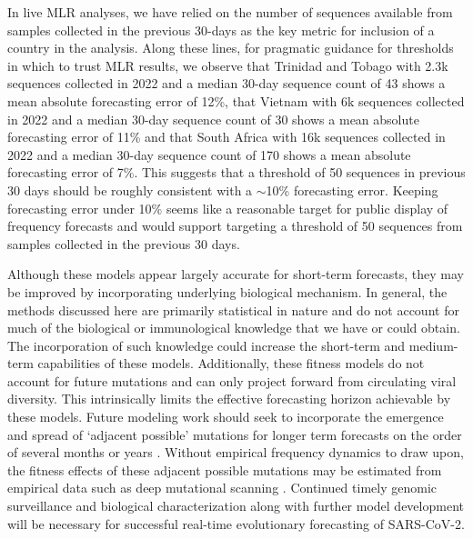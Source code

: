 \documentclass[10pt,letterpaper]{article}
\begin{document}
In live MLR analyses, we have relied on the number of sequences available from samples collected in the previous 30-days as the key metric for inclusion of a country in the analysis.
Along these lines, for pragmatic guidance for thresholds in which to trust MLR results, we observe that Trinidad and Tobago with 2.3k sequences collected in 2022 and a median 30-day sequence count of 43 shows a mean absolute forecasting error of 12\%, that Vietnam with 6k sequences collected in 2022 and a median 30-day sequence count of 30 shows a mean absolute forecasting error of 11\% and that South Africa with 16k sequences collected in 2022 and a median 30-day sequence count of 170 shows a mean absolute forecasting error of 7\%.
This suggests that a threshold of 50 sequences in previous 30 days should be roughly consistent with a $\sim$10\% forecasting error.
Keeping forecasting error under 10\%  seems like a reasonable target for public display of frequency forecasts and would support targeting a threshold of 50 sequences from samples collected in the previous 30 days.


Although these models appear largely accurate for short-term forecasts, they may be improved by incorporating underlying biological mechanism.
In general, the methods discussed here are primarily statistical in nature and do not account for much of the biological or immunological knowledge that we have or could obtain.
The incorporation of such knowledge could increase the short-term and medium-term capabilities of these models.
Additionally, these fitness models do not account for future mutations and can only project forward from circulating viral diversity.
This intrinsically limits the effective forecasting horizon achievable by these models.
Future modeling work should seek to incorporate the emergence and spread of `adjacent possible' mutations for longer term forecasts on the order of several months or years \cite{kauffman1993origins}.
Without empirical frequency dynamics to draw upon, the fitness effects of these adjacent possible mutations may be estimated from empirical data such as deep mutational scanning \cite{cao2022ba, greaney2022antibody, dadonaite2023full}.
Continued timely genomic surveillance and biological characterization along with further model development will be necessary for successful real-time evolutionary forecasting of SARS-CoV-2.
\end{document}
